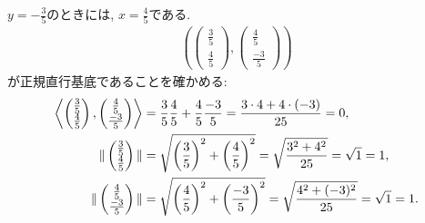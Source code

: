 \begin{checkanswer}
  $y=-\frac{3}{5}$のときには,
  $x=\frac{4}{5}$である.
    \begin{align*}
    (\begin{pmatrix}\frac{3}{5}\\\frac{4}{5}\end{pmatrix},
    \begin{pmatrix}\frac{4}{5}\\\frac{-3}{5}\end{pmatrix})
  \end{align*}
  が正規直行基底であることを確かめる:
  \begin{align*}
    \Braket{\begin{pmatrix}\frac{3}{5}\\\frac{4}{5}\end{pmatrix},
    \begin{pmatrix}\frac{4}{5}\\\frac{-3}{5}\end{pmatrix}}
    &=\frac{3}{5}\frac{4}{5}+\frac{4}{5}\frac{-3}{5}
    =\frac{3\cdot4+4\cdot(-3)}{25}
    =0,\\
    \|\begin{pmatrix}\frac{3}{5}\\\frac{4}{5}\end{pmatrix}\|
    &=\sqrt{\left(\frac{3}{5}\right)^2+\left(\frac{4}{5}\right)^2}
    =\sqrt{\frac{3^2+4^2}{25}}
    =\sqrt{1}=1,\\
    \|\begin{pmatrix}\frac{4}{5}\\\frac{-3}{5}\end{pmatrix}\|
    &=\sqrt{\left(\frac{4}{5}\right)^2+\left(\frac{-3}{5}\right)^2}
    =\sqrt{\frac{4^2+(-3)^2}{25}}
    =\sqrt{1}=1.
  \end{align*}
\end{checkanswer}

